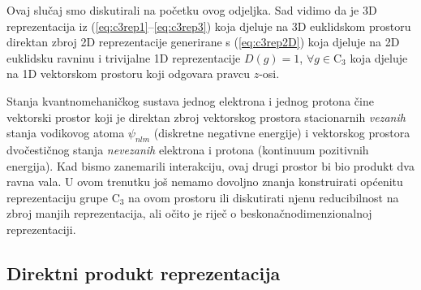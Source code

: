 \begin{primjer}
Ovaj slučaj smo diskutirali na početku ovog odjeljka. Sad vidimo
da je 3D reprezentacija iz (\ref{eq:c3rep1}--\ref{eq:c3rep3}) koja
djeluje na 3D euklidskom prostoru
direktan zbroj 2D reprezentacije generirane s (\ref{eq:c3rep2D})
koja djeluje na 2D euklidsku ravninu i
trivijalne 1D reprezentacije $D(g) = 1$, $\forall g\in \mathrm{C}_3$
koja djeluje na 1D vektorskom prostoru koji odgovara pravcu $z$-osi.
\end{primjer}


\begin{primjer}
Stanja kvantnomehaničkog sustava jednog elektrona i jednog protona
čine vektorski prostor koji je direktan zbroj
vektorskog prostora stacionarnih \emph{vezanih} stanja vodikovog
atoma $\psi_{nlm}$ (diskretne negativne energije) i vektorskog prostora dvočestičnog stanja
\emph{nevezanih} elektrona i protona (kontinuum pozitivnih energija).
Kad bismo zanemarili interakciju, ovaj drugi prostor bi bio produkt 
dva ravna vala. U ovom trenutku još nemamo dovoljno znanja konstruirati
općenitu reprezentaciju grupe $\mathrm{C}_3$ na ovom prostoru ili diskutirati
njenu reducibilnost na zbroj manjih reprezentacija, ali očito
je riječ o beskonačnodimenzionalnoj reprezentaciji. 
\end{primjer}


\subsection*{Direktni produkt reprezentacija}

